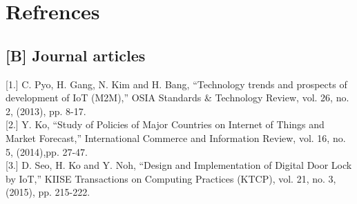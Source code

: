 \documentclass[twoside,a4paper,16pt]{book}
\begin{document}
{{\begin{figure}
		
		\end{figure}
			
			\chapter{Refrences}
			
			\section{[B] Journal articles}
			
			
			[1.]	C. Pyo, H. Gang, N. Kim and H. Bang, “Technology trends and prospects 
			of development of IoT (M2M),” OSIA Standards \& Technology Review, vol. 26, no. 2, (2013), pp. 8-17.\\
			
			{[2.]}	Y. Ko, “Study of Policies of Major Countries on Internet of Things and Market Forecast,” International Commerce and Information Review, vol. 16, no. 5, (2014),pp. 27-47.\\
			
			{[3.]}	D.  Seo,  H.  Ko  and  Y.  Noh,  “Design  and  Implementation  of  Digital  Door  Lock  by  IoT,”  KIISE Transactions on Computing Practices (KTCP), vol. 21, no. 3, (2015), pp. 215-222.\\
			
}}
\end{document}

